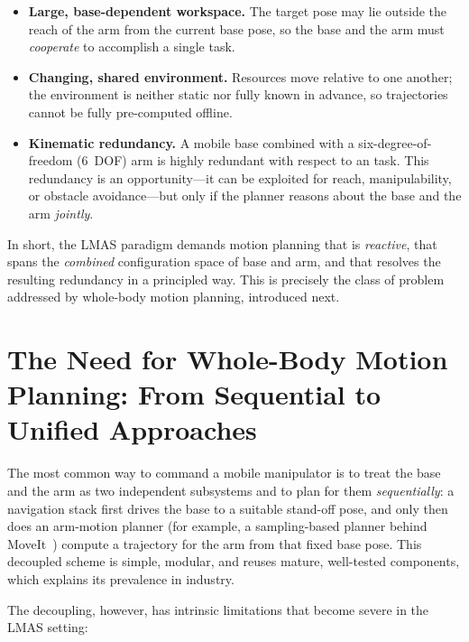 \begin{itemize}
  \item \textbf{Large, base-dependent workspace.} The target \ee{} pose
        may lie outside the reach of the arm from the current base pose,
        so the base and the arm must \emph{cooperate} to accomplish a
        single task.
  \item \textbf{Changing, shared environment.} Resources move relative to
        one another; the environment is neither static nor fully known in
        advance, so trajectories cannot be fully pre-computed offline.
  \item \textbf{Kinematic redundancy.} A mobile base combined with a
        six-degree-of-freedom (\SI{6}{DOF}) arm is highly redundant with
        respect to an \ee{} task. This redundancy is an opportunity---it
        can be exploited for reach, manipulability, or obstacle
        avoidance---but only if the planner reasons about the base and
        the arm \emph{jointly}.
\end{itemize}

In short, the LMAS paradigm demands motion planning that is
\emph{reactive}, that spans the \emph{combined} configuration space of
base and arm, and that resolves the resulting redundancy in a principled
way. This is precisely the class of problem addressed by whole-body
motion planning, introduced next.

\section{The Need for Whole-Body Motion Planning: From Sequential to
  Unified Approaches}
\label{sec:need-wholebody}

The most common way to command a mobile manipulator is to treat the base
and the arm as two independent subsystems and to plan for them
\emph{sequentially}: a navigation stack first drives the base to a
suitable stand-off pose, and only then does an arm-motion planner (for
example, a sampling-based planner behind MoveIt~\cite{moveit2}) compute a
trajectory for the arm from that fixed base pose. This decoupled scheme
is simple, modular, and reuses mature, well-tested components, which
explains its prevalence in industry.

The decoupling, however, has intrinsic limitations that become severe in
the LMAS setting:


